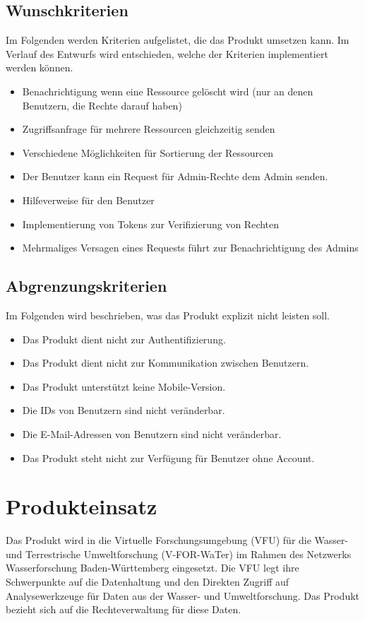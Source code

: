 \documentclass[parskip=full,11pt]{scrartcl}
\begin{document}
\subsection{Wunschkriterien}
Im Folgenden werden Kriterien aufgelistet, die das Produkt umsetzen kann.
Im Verlauf des Entwurfs wird entschieden, welche der Kriterien  implementiert werden können.
\begin{itemize}[itemsep=0pt]
\item Benachrichtigung wenn eine Ressource gelöscht wird (nur an denen Benutzern, die Rechte darauf haben) 
\item Zugriffsanfrage für mehrere Ressourcen gleichzeitig senden
\item Verschiedene Möglichkeiten für Sortierung der Ressourcen
\item Der Benutzer kann ein Request für \gls{Admin-Rechte} dem Admin senden.
\item Hilfeverweise für den Benutzer
\item Implementierung von Tokens zur Verifizierung von Rechten
\item Mehrmaliges Versagen eines Requests führt zur Benachrichtigung des Admins
\end{itemize}

\subsection{Abgrenzungskriterien}
Im Folgenden wird beschrieben, was das Produkt explizit nicht leisten soll.
\begin{itemize}[itemsep=0pt]
\item Das Produkt dient nicht zur Authentifizierung.
\item Das Produkt dient nicht zur Kommunikation zwischen Benutzern.
\item Das Produkt unterstützt keine Mobile-Version.
\item Die IDs von Benutzern sind nicht veränderbar.
\item Die E-Mail-Adressen von Benutzern sind nicht veränderbar.
\item Das Produkt steht nicht zur Verfügung für Benutzer ohne Account.
\end{itemize}


\section{Produkteinsatz}
Das Produkt wird in die Virtuelle Forschungsumgebung (VFU) für die Wasser-
und Terrestrische Umweltforschung (V-FOR-WaTer) im Rahmen des Netzwerks
Wasserforschung Baden-Württemberg eingesetzt. Die VFU legt ihre Schwerpunkte
auf die Datenhaltung und den Direkten Zugriff auf Analysewerkzeuge für Daten
aus der Wasser- und Umweltforschung. Das Produkt bezieht sich auf die
Rechteverwaltung für diese Daten.
\end{document}
